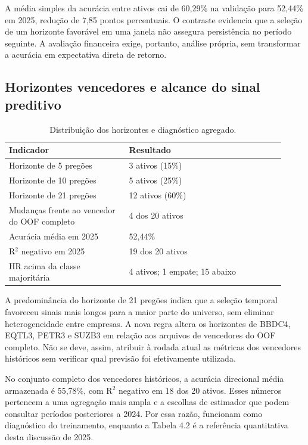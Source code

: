 A média simples da acurácia entre ativos cai de 60,29\% na validação para 52,44\% em 2025, redução de 7,85 pontos percentuais. O contraste evidencia que a seleção de um horizonte favorável em uma janela não assegura persistência no período seguinte. A avaliação financeira exige, portanto, análise própria, sem transformar a acurácia em expectativa direta de retorno.

\subsection*{Horizontes vencedores e alcance do sinal preditivo}
\begin{table}[H]
\centering
\caption{Distribuição dos horizontes e diagnóstico agregado.}
{\footnotesize
\begin{tabular}{p{0.40\linewidth}p{0.52\linewidth}}
\hline
Indicador & Resultado \\ \hline
Horizonte de 5 pregões & 3 ativos (15\%) \\
Horizonte de 10 pregões & 5 ativos (25\%) \\
Horizonte de 21 pregões & 12 ativos (60\%) \\
Mudanças frente ao vencedor do OOF completo & 4 dos 20 ativos \\
Acurácia média em 2025 & 52,44\% \\
R$^{2}$ negativo em 2025 & 19 dos 20 ativos \\
HR acima da classe majoritária & 4 ativos; 1 empate; 15 abaixo \\
\hline
\end{tabular}}
\par{}
\end{table}
A predominância do horizonte de 21 pregões indica que a seleção temporal favoreceu sinais mais longos para a maior parte do universo, sem eliminar heterogeneidade entre empresas. A nova regra altera os horizontes de BBDC4, EQTL3, PETR3 e SUZB3 em relação aos arquivos de vencedores do OOF completo. Não se deve, assim, atribuir à rodada atual as métricas dos vencedores históricos sem verificar qual previsão foi efetivamente utilizada.

No conjunto completo dos vencedores históricos, a acurácia direcional média armazenada é 55,78\%, com R$^{2}$ negativo em 18 dos 20 ativos. Esses números pertencem a uma agregação mais ampla e a escolhas de estimador que podem consultar períodos posteriores a 2024. Por essa razão, funcionam como diagnóstico do treinamento, enquanto a Tabela 4.2 é a referência quantitativa desta discussão de 2025.

